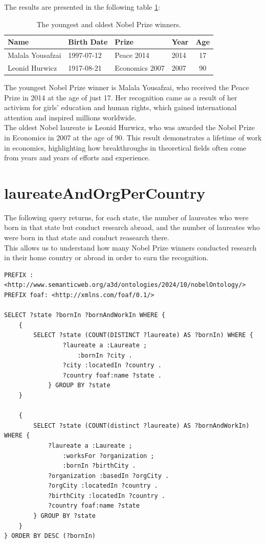 \documentclass{article}
\begin{document}
The results are presented in the following table \ref{tab:youngest_oldest}:

\begin{table}[H]
	\centering
	\caption{The youngest and oldest Nobel Prize winners.}
	\begin{tabular}{|l|l|l|l|c|}
		\hline
		\textbf{Name}    & \textbf{Birth Date} & \textbf{Prize} & \textbf{Year} & \textbf{Age} \\ \hline
		Malala Yousafzai & 1997-07-12          & Peace 2014     & 2014          & 17           \\ \hline
		Leonid Hurwicz   & 1917-08-21          & Economics 2007 & 2007          & 90           \\ \hline
	\end{tabular}
	\label{tab:youngest_oldest}
\end{table}

The youngest Nobel Prize winner is Malala Yousafzai, who received the Peace Prize in 2014 at the age of just 17.
Her recognition came as a result of her activism for girls' education and human rights, which gained international
attention and inspired millions worldwide.\\
The oldest Nobel laureate is Leonid Hurwicz, who was awarded the Nobel Prize in Economics in 2007 at the age of 90.
This result demonstrates a lifetime of work in economics, highlighting how breakthroughs in theoretical fields
often come from years and years of efforts and experience.

\section{laureateAndOrgPerCountry}
The following query returns, for each state, the number of laureates who were born in that state but conduct research abroad, and the number of
laureates who were born in that state and conduct reasearch there.\\
This allows us to understand how many Nobel Prize winners conducted research in their home country or abroad in order to earn the recognition.
\begin{lstlisting}
PREFIX : <http://www.semanticweb.org/a3d/ontologies/2024/10/nobelOntology/>
PREFIX foaf: <http://xmlns.com/foaf/0.1/>

SELECT ?state ?bornIn ?bornAndWorkIn WHERE {
	{
        SELECT ?state (COUNT(DISTINCT ?laureate) AS ?bornIn) WHERE {
			    ?laureate a :Laureate ;
			        :bornIn ?city .
			    ?city :locatedIn ?country .
			    ?country foaf:name ?state .
		    } GROUP BY ?state
    }
    	
    {
        SELECT ?state (COUNT(distinct ?laureate) AS ?bornAndWorkIn) WHERE {
            ?laureate a :Laureate ;
                :worksFor ?organization ;
                :bornIn ?birthCity .
            ?organization :basedIn ?orgCity .
            ?orgCity :locatedIn ?country .
            ?birthCity :locatedIn ?country .
            ?country foaf:name ?state
        } GROUP BY ?state
    }	
} ORDER BY DESC (?bornIn)
\end{lstlisting}
\end{document}
